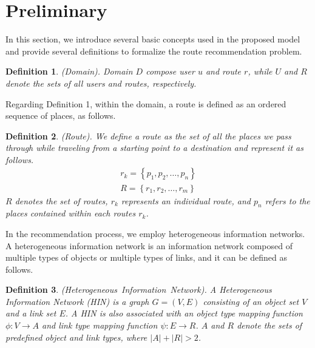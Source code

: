 \documentclass[]{article}
\newtheorem{definition}{Definition}
\begin{document}
\section{Preliminary}
\label{sec:Pre}
In this section, we introduce several basic concepts used in the proposed model and provide several definitions to formalize the route recommendation problem. 

\begin{definition}
	(Domain). Domain $D$ compose user $u$ and route $r$, while $U$ and $R$ denote the sets of all users and routes, respectively.
\end{definition}	

Regarding Definition 1, within the domain, a route is defined as an ordered sequence of places, as follows.
\begin{definition}
	(Route). We define a route as the set of all the places we pass through while traveling from a starting point to a destination and represent it as follows.
	\begin{equation}
		\begin{aligned}
			r_{k} = \left\{p_{1}, p_{2}, \ldots, p_{n}\right\}\\
			R = \left\{r_{1}, r_{2}, \ldots, r_{m}\right\}
		\end{aligned}
	\end{equation}
	\label{equation2}
	\newline
	$R$ denotes the set of routes, $r_{k}$ represents an individual route, and $p_{n}$ refers to the places contained within each routes $r_{k}$.
\end{definition}

In the recommendation process, we employ heterogeneous information networks. A heterogeneous information network is an information network composed of multiple types of objects or multiple types of links, and it can be defined as follows.
\begin{definition}
 	(Heterogeneous\ Information\ Network).	A Heterogeneous Information Network (HIN) is a graph $G = (V,E)$ consisting of an object set $V$ and a link set $E$. A HIN is also associated with an object type mapping function  $\phi : V\to A$ and link type mapping function $\psi : E\to R$. $A$ and $R$ denote the sets of predefined object and link types, where $\left|A \right|+\left|R \right|> 2$.
\end{definition}
\end{document}
